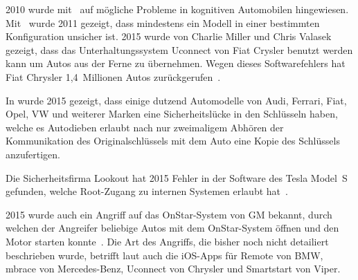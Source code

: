 2010 wurde mit~\cite{Koscher2010} auf mögliche Probleme in kognitiven
Automobilen hingewiesen. Mit~\cite{Checkoway2011} wurde 2011 gezeigt, dass
mindestens ein Modell in einer bestimmten Konfiguration unsicher ist. 2015
wurde von Charlie Miller und Chris Valasek gezeigt, dass das
Unterhaltungssystem Uconnect von Fiat Crysler benutzt werden kann um Autos aus
der Ferne zu übernehmen. Wegen dieses Softwarefehlers hat Fiat Chrysler
1,4~Millionen Autos zurückgerufen~\cite{Gallagher2015}.

In \cite{Verdult2015} wurde 2015 gezeigt, dass einige dutzend Automodelle von
Audi, Ferrari, Fiat, Opel, VW und weiterer Marken eine Sicherheitslücke in den
Schlüsseln haben, welche es Autodieben erlaubt nach nur zweimaligem Abhören der
Kommunikation des Originalschlüssels mit dem Auto eine Kopie des Schlüssels
anzufertigen.

Die Sicherheitsfirma Lookout hat 2015 Fehler in der Software des Tesla Model~S
gefunden, welche Root-Zugang zu internen Systemen erlaubt hat~\cite{Mahaffey2015}.

2015 wurde auch ein Angriff auf das OnStar-System von GM bekannt, durch welchen
der Angreifer beliebige Autos mit dem OnStar-System öffnen und den Motor
starten konnte~\cite{Stevens2015}. Die Art des Angriffs, die bisher noch nicht
detailiert beschrieben wurde, betrifft laut \cite{Greenberg2015} auch die
iOS-Apps für Remote von BMW, mbrace von Mercedes-Benz, Uconnect von Chrysler
und Smartstart von Viper.








